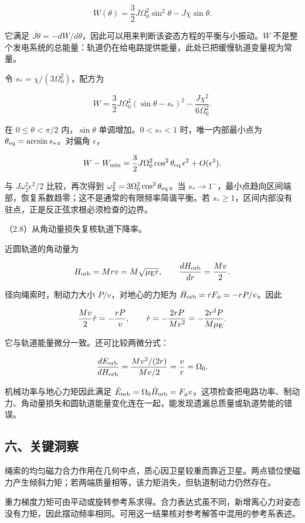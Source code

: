 \documentclass[12pt,a4paper,fontset=fandol]{ctexart}
\begin{document}
\[
W(\theta)=\frac32J\Omega_0^2\sin^2\theta-J\chi\sin\theta.
\]

它满足
\(J\ddot\theta=-dW/d\theta\)，因此可以用来判断该姿态方程的平衡与小振动。\(W\)
不是整个发电系统的总能量：轨道仍在给电路提供能量，此处已把缓慢轨道变量视为常量。

令 \(s_*=\chi/(3\Omega_0^2)\)，配方为

\[
W=\frac32J\Omega_0^2(\sin\theta-s_*)^2
-\frac{J\chi^2}{6\Omega_0^2}.
\]

在 \(0\le\theta<\pi/2\) 内，\(\sin\theta\) 单调增加。\(0<s_*<1\)
时，唯一内部最小点为 \(\theta_{\rm eq}=\arcsin s_*\)。对偏角
\(\epsilon\)，

\[
W-W_{\min}
=\frac32J\Omega_0^2\cos^2\theta_{\rm eq}\,\epsilon^2
+O(\epsilon^3).
\]

与 \(J\omega_2^2\epsilon^2/2\) 比较，再次得到
\(\omega_2^2=3\Omega_0^2\cos^2\theta_{\rm eq}\)。当
\(s_*\to1^-\)，最小点趋向区间端部，恢复系数趋零；这不是通常的有限频率简谐平衡。若
\(s_*\ge1\)，区间内部没有驻点，正是反正弦求根必须检查的边界。

（2.8）从角动量损失复核轨道下降率。

近圆轨道的角动量为

\[
H_{\rm orb}=Mr v=M\sqrt{\mu_{\rm E}r},\qquad
\frac{dH_{\rm orb}}{dr}=\frac{Mv}{2}.
\]

径向绳索时，制动力大小 \(P/v\)，对地心的力矩为
\(\dot H_{\rm orb}=rF_\phi=-rP/v\)。因此

\[
\frac{Mv}{2}\dot r=-\frac{rP}{v},\qquad
\dot r=-\frac{2rP}{Mv^2}
=-\frac{2r^2P}{M\mu_{\rm E}}.
\]

它与轨道能量微分一致。还可比较两微分式：

\[
\frac{dE_{\rm orb}}{dH_{\rm orb}}
=\frac{Mv^2/(2r)}{Mv/2}=\frac vr=\Omega_0.
\]

机械功率与地心力矩因此满足
\(\dot E_{\rm orb}=\Omega_0\dot H_{\rm orb}=F_\phi v\)。这项检查把电路功率、制动力、角动量损失和圆轨道能量变化连在一起，能发现遗漏总质量或轨道势能的错误。

\subsection{六、关键洞察}\label{ux516dux5173ux952eux6d1eux5bdf-3}

绳索的均匀磁力合力作用在几何中点，质心因卫星较重而靠近卫星。两点错位使磁力产生倾斜力矩；若两端质量相等，该力矩消失，但轨道制动力仍然存在。

重力梯度力矩可由平动或旋转参考系求得。合力表达式虽不同，新增离心力对姿态没有力矩，因此摆动频率相同。可用这一结果核对参考解答中混用的参考系表述。
\end{document}
